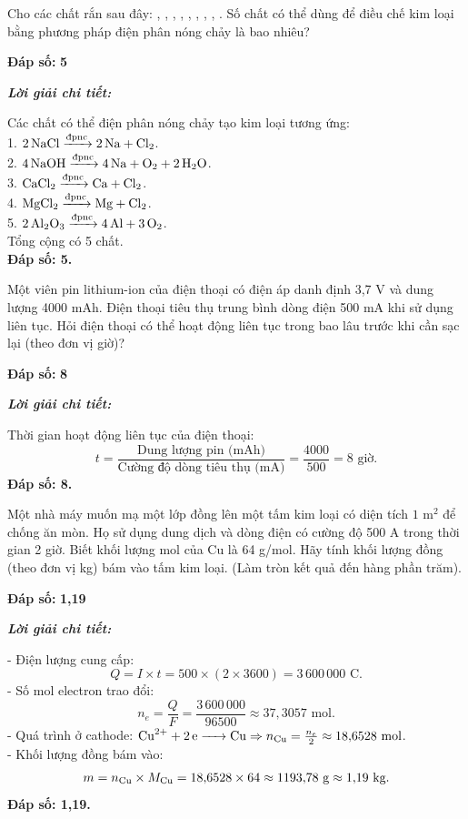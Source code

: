 \documentclass[11pt,a4paper]{article}
\def\loigiai#1{
\par\begingroup\color{blue!80!black}\small
\noindent\textbf{\textit{Lời giải chi tiết:}}\par
#1\par\endgroup}
\begin{document}
\begin{ex}
Cho các chất rắn sau đây: , , , , , , , , . Số chất có thể dùng để điều chế kim loại bằng phương pháp điện phân nóng chảy là bao nhiêu?
\par\noindent\textbf{Đáp số:} \textbf{\color{red}5}
\loigiai{
Các chất có thể điện phân nóng chảy tạo kim loại tương ứng:\\
1. $\ce{2NaCl ->[\text{đpnc}] 2Na + Cl2}$.\\
2. $\ce{4NaOH ->[\text{đpnc}] 4Na + O2 + 2H2O}$.\\
3. $\ce{CaCl2 ->[\text{đpnc}] Ca + Cl2}$.\\
4. $\ce{MgCl2 ->[\text{đpnc}] Mg + Cl2}$.\\
5. $\ce{2Al2O3 ->[\text{đpnc}] 4Al + 3O2}$.\\
Tổng cộng có 5 chất.\\
\textbf{Đáp số: 5.}}
\end{ex}

\begin{ex}
Một viên pin lithium-ion của điện thoại có điện áp danh định 3,7 V và dung lượng 4000 mAh. Điện thoại tiêu thụ trung bình dòng điện 500 mA khi sử dụng liên tục. Hỏi điện thoại có thể hoạt động liên tục trong bao lâu trước khi cần sạc lại (theo đơn vị giờ)?
\par\noindent\textbf{Đáp số:} \textbf{\color{red}8}
\loigiai{
Thời gian hoạt động liên tục của điện thoại:
$$t = \frac{\text{Dung lượng pin (mAh)}}{\text{Cường độ dòng tiêu thụ (mA)}} = \frac{4000}{500} = 8\text{ giờ.}$$
\textbf{Đáp số: 8.}}
\end{ex}

\begin{ex}
Một nhà máy muốn mạ một lớp đồng lên một tấm kim loại có diện tích $1\text{ m}^2$ để chống ăn mòn. Họ sử dụng dung dịch  và dòng điện có cường độ 500 A trong thời gian 2 giờ. Biết khối lượng mol của Cu là 64 g/mol. Hãy tính khối lượng đồng (theo đơn vị kg) bám vào tấm kim loại. (Làm tròn kết quả đến hàng phần trăm).
\par\noindent\textbf{Đáp số:} \textbf{\color{red}1,19}
\loigiai{
- Điện lượng cung cấp:
$$Q = I \times t = 500 \times (2 \times 3600) = 3\,600\,000\text{ C.}$$
- Số mol electron trao đổi:
$$n_e = \frac{Q}{F} = \frac{3\,600\,000}{96500} \approx 37{,}3057\text{ mol.}$$
- Quá trình ở cathode: $\ce{Cu^2+ + 2e -> Cu} \Rightarrow n_{\ce{Cu}} = \frac{n_e}{2} \approx 18{,}6528\text{ mol}$.\\
- Khối lượng đồng bám vào:
$$m = n_{\ce{Cu}} \times M_{\ce{Cu}} = 18{,}6528 \times 64 \approx 1193{,}78\text{ g} \approx 1{,}19\text{ kg.}$$
\textbf{Đáp số: 1,19.}}
\end{ex}
\end{document}
